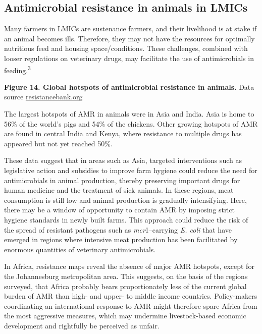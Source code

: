 \documentclass[
]{book}
\begin{document}
\hypertarget{antimicrobial-resistance-in-animals-in-lmics}{%
\subsection*{Antimicrobial resistance in animals in LMICs}\label{antimicrobial-resistance-in-animals-in-lmics}}

Many farmers in LMICs are sustenance farmers, and their livelihood is at stake if an animal becomes ills. Therefore, they may not have the resources for optimally nutritious feed and housing space/conditions. These challenges, combined with looser regulations on veterinary drugs, may facilitate the use of antimicrobials in feeding.\textsuperscript{3}

\textbf{Figure 14. Global hotspots of antimicrobial resistance in animals.} Data source \href{https://resistancebank.org/}{resistancebank.org}

The largest hotspots of AMR in animals were in Asia and India. Asia is home to 56\% of the world's pigs and 54\% of the chickens. Other growing hotspots of AMR are found in central India and Kenya, where resistance to multiple drugs has appeared but not yet reached 50\%.

These data suggest that in areas such as Asia, targeted interventions such as legislative action and subsidies to improve farm hygiene could reduce the need for antimicrobials in animal production, thereby preserving important drugs for human medicine and the treatment of sick animals. In these regions, meat consumption is still low and animal production is gradually intensifying. Here, there may be a window of opportunity to contain AMR by imposing strict hygiene standards in newly built farms. This approach could reduce the risk of the spread of resistant pathogens such as \emph{mcr}1--carrying \emph{E. coli} that have emerged in regions where intensive meat production has been facilitated by enormous quantities of veterinary antimicrobials.

In Africa, resistance maps reveal the absence of major AMR hotspots, except for the Johannesburg metropolitan area. This suggests, on the basis of the regions surveyed, that Africa probably bears proportionately less of the current global burden of AMR than high- and upper- to middle income countries. Policy-makers coordinating an international response to AMR might therefore spare Africa from the most aggressive measures, which may undermine livestock-based economic development and rightfully be perceived as unfair.
\end{document}
